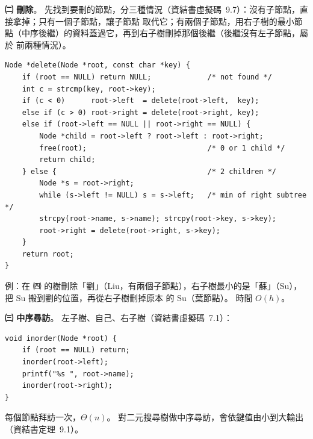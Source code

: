\begin{pastsoln}
\textbf{㈡ 刪除}。 先找到要刪的節點，分三種情況（資結書虛擬碼~9.7）：沒有子節點，直接拿掉；只有一個子節點，讓子節點
取代它；有兩個子節點，用右子樹的最小節點（中序後繼）的資料蓋過它，再到右子樹刪掉那個後繼（後繼沒有左子節點，屬於
前兩種情況）。
\begin{verbatim}
Node *delete(Node *root, const char *key) {
    if (root == NULL) return NULL;             /* not found */
    int c = strcmp(key, root->key);
    if (c < 0)      root->left  = delete(root->left,  key);
    else if (c > 0) root->right = delete(root->right, key);
    else if (root->left == NULL || root->right == NULL) {
        Node *child = root->left ? root->left : root->right;
        free(root);                            /* 0 or 1 child */
        return child;
    } else {                                   /* 2 children */
        Node *s = root->right;
        while (s->left != NULL) s = s->left;   /* min of right subtree */
        strcpy(root->name, s->name); strcpy(root->key, s->key);
        root->right = delete(root->right, s->key);
    }
    return root;
}
\end{verbatim}
例：在 ㈣ 的樹刪除「劉」（Liu，有兩個子節點），右子樹最小的是「蘇」（Su），把 Su 搬到劉的位置，再從右子樹刪掉原本
的 Su（葉節點）。 時間 $O(h)$。

\textbf{㈢ 中序尋訪}。 左子樹、自己、右子樹（資結書虛擬碼~7.1）：
\begin{verbatim}
void inorder(Node *root) {
    if (root == NULL) return;
    inorder(root->left);
    printf("%s ", root->name);
    inorder(root->right);
}
\end{verbatim}
每個節點拜訪一次，$\Theta(n)$。 對二元搜尋樹做中序尋訪，會依鍵值由小到大輸出（資結書定理~9.1）。


\end{pastsoln}
